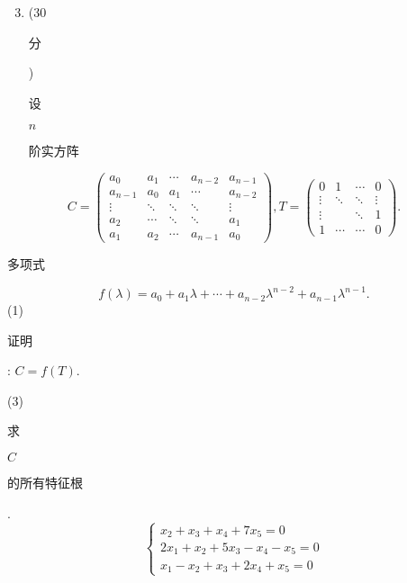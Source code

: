 \documentclass[10pt]{article}
\begin{document}
\begin{enumerate}
  \setcounter{enumi}{2}
  \item (30 \begin{CJK}{UTF8}{mj}分\end{CJK}) \begin{CJK}{UTF8}{mj}设\end{CJK} $n$ \begin{CJK}{UTF8}{mj}阶实方阵\end{CJK}
\end{enumerate}
$$
C=\left(\begin{array}{ccccc}
a_{0} & a_{1} & \cdots & a_{n-2} & a_{n-1} \\
a_{n-1} & a_{0} & a_{1} & \cdots & a_{n-2} \\
\vdots & \ddots & \ddots & \ddots & \vdots \\
a_{2} & \cdots & \ddots & \ddots & a_{1} \\
a_{1} & a_{2} & \cdots & a_{n-1} & a_{0}
\end{array}\right), T=\left(\begin{array}{cccc}
0 & 1 & \cdots & 0 \\
\vdots & \ddots & \ddots & \vdots \\
\vdots & & \ddots & 1 \\
1 & \cdots & \cdots & 0
\end{array}\right) .
$$
\begin{CJK}{UTF8}{mj}多项式\end{CJK}
$$
f(\lambda)=a_{0}+a_{1} \lambda+\cdots+a_{n-2} \lambda^{n-2}+a_{n-1} \lambda^{n-1} .
$$
(1) \begin{CJK}{UTF8}{mj}证明\end{CJK}: $C=f(T)$.

(3) \begin{CJK}{UTF8}{mj}求\end{CJK} $C$ \begin{CJK}{UTF8}{mj}的所有特征根\end{CJK}.
$$
\left\{\begin{array}{l}
x_{2}+x_{3}+x_{4}+7 x_{5}=0 \\
2 x_{1}+x_{2}+5 x_{3}-x_{4}-x_{5}=0 \\
x_{1}-x_{2}+x_{3}+2 x_{4}+x_{5}=0
\end{array}\right.
$$
\end{document}
